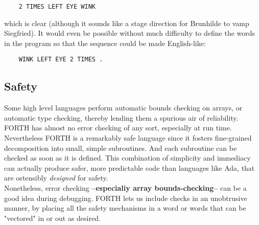 \begin{lstlisting}
    2 TIMES LEFT EYE WINK
\end{lstlisting}

which is clear (although it sounds like a stage direction for Brunhilde to vamp Siegfried). It would even be possible without much difficulty to define the words in the program so that the sequence could be made English-like:

\begin{lstlisting}
    WINK LEFT EYE 2 TIMES .
\end{lstlisting}

\subsection{Safety}

Some high level languages perform automatic bounds checking on arrays, or automatic type checking, thereby lending them a spurious air of reliability. FORTH has almost no error checking
of any sort, especially at run time. Nevertheless FORTH is a remarkably safe language since it fosters fine-grained decomposition into small, simple subroutines. And each subroutine can be checked as soon as it is defined. This combination of simplicity and immediacy can actually produce safer, more predictable code than languages like Ada, that are ostensibly \textit{designed} for safety.
\\

\leftbar[1\linewidth]
Nonetheless, error checking \textbf{--especialiy array bounds-checking--} can be a good idea during debugging. FORTH lets us include checks in an unobtrusive manner, by placing all the safety mechanisms in a word or words that can be "vectored" in or out as desired\footnotemark.
\endleftbar
{}
